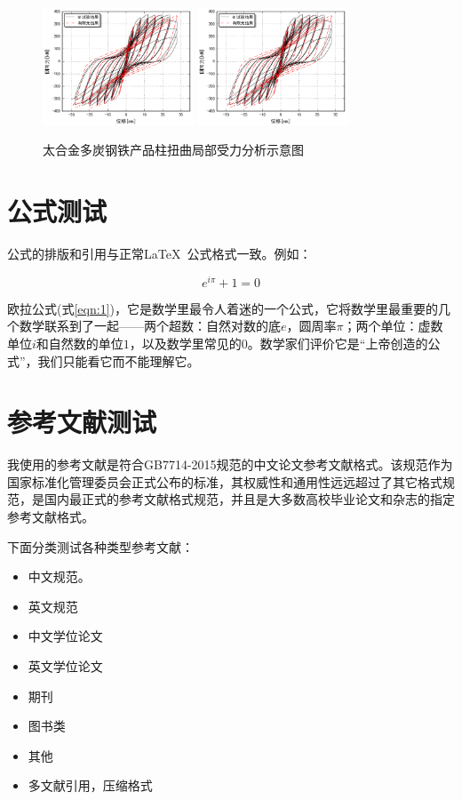 \documentclass{bjtu-bachelor-thesis}
\begin{document}
\begin{figure}
    \centering
    {\includegraphics[width=0.4\textwidth]{pic/G1.png}}
    {\includegraphics[width=0.4\textwidth]{pic/G1.png}}
    \caption{太合金多炭钢铁产品柱扭曲局部受力分析示意图}\label{fig:2}
\end{figure}

\section{公式测试}
公式的排版和引用与正常\LaTeX\ 公式格式一致。例如：

\begin{equation}
    \label{eqn:1}
    e^{i\pi}+1=0
\end{equation}

欧拉公式(式\ref{eqn:1})，它是数学里最令人着迷的一个公式，它将数学里最重要的几个数学联系到了一起——两个超数：自然对数的底$e$，圆周率$\pi$；两个单位：虚数单位$i$和自然数的单位$1$，以及数学里常见的$0$。数学家们评价它是“上帝创造的公式”，我们只能看它而不能理解它。

\section{参考文献测试}
我使用的参考文献是符合GB7714-2015规范的中文论文参考文献格式。该规范作为国家标准化管理委员会正式公布的标准，其权威性和通用性远远超过了其它格式规范，是国内最正式的参考文献格式规范，并且是大多数高校毕业论文和杂志的指定参考文献格式。

下面分类测试各种类型参考文献：

\begin{itemize}
    \item 中文规范\citep{C1}。
    \item 英文规范\citep{ACI318}
    \item 中文学位论文\citep{liguiqian}
    \item 英文学位论文\citep{bentz2000}
    \item 期刊\citep{FMK}
    \item 图书类\citep{B1}
    \item 其他\citep{R1}
    \item 多文献引用，压缩格式\citep{C1,ACI318,liguiqian,R1}
\end{itemize}
\end{document}
